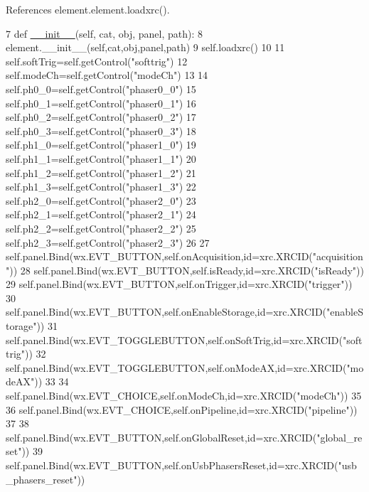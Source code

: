 References element.\+element.\+loadxrc().


\begin{DoxyCode}
7     \textcolor{keyword}{def }\hyperlink{classwrapper_1_1ModuleDictWrapper_a9a7a794150502f51df687831583e13b9}{\_\_init\_\_}(self, cat, obj, panel, path):
8         element.\_\_init\_\_(self,cat,obj,panel,path)
9         self.loadxrc()
10 
11         self.softTrig=self.getControl(\textcolor{stringliteral}{"softtrig"})
12         self.modeCh=self.getControl(\textcolor{stringliteral}{"modeCh"})
13 
14         self.ph0\_0=self.getControl(\textcolor{stringliteral}{"phaser0\_0"})
15         self.ph0\_1=self.getControl(\textcolor{stringliteral}{"phaser0\_1"})
16         self.ph0\_2=self.getControl(\textcolor{stringliteral}{"phaser0\_2"})
17         self.ph0\_3=self.getControl(\textcolor{stringliteral}{"phaser0\_3"})
18         self.ph1\_0=self.getControl(\textcolor{stringliteral}{"phaser1\_0"})
19         self.ph1\_1=self.getControl(\textcolor{stringliteral}{"phaser1\_1"})
20         self.ph1\_2=self.getControl(\textcolor{stringliteral}{"phaser1\_2"})
21         self.ph1\_3=self.getControl(\textcolor{stringliteral}{"phaser1\_3"})
22         self.ph2\_0=self.getControl(\textcolor{stringliteral}{"phaser2\_0"})
23         self.ph2\_1=self.getControl(\textcolor{stringliteral}{"phaser2\_1"})
24         self.ph2\_2=self.getControl(\textcolor{stringliteral}{"phaser2\_2"})
25         self.ph2\_3=self.getControl(\textcolor{stringliteral}{"phaser2\_3"})
26 
27         self.panel.Bind(wx.EVT\_BUTTON,self.onAcquisition,id=xrc.XRCID(\textcolor{stringliteral}{"acquisition"}))
28         self.panel.Bind(wx.EVT\_BUTTON,self.isReady,id=xrc.XRCID(\textcolor{stringliteral}{"isReady"}))
29         self.panel.Bind(wx.EVT\_BUTTON,self.onTrigger,id=xrc.XRCID(\textcolor{stringliteral}{"trigger"}))
30         self.panel.Bind(wx.EVT\_BUTTON,self.onEnableStorage,id=xrc.XRCID(\textcolor{stringliteral}{"enableStorage"}))
31         self.panel.Bind(wx.EVT\_TOGGLEBUTTON,self.onSoftTrig,id=xrc.XRCID(\textcolor{stringliteral}{"softtrig"}))
32         self.panel.Bind(wx.EVT\_TOGGLEBUTTON,self.onModeAX,id=xrc.XRCID(\textcolor{stringliteral}{"modeAX"}))
33 
34         self.panel.Bind(wx.EVT\_CHOICE,self.onModeCh,id=xrc.XRCID(\textcolor{stringliteral}{"modeCh"}))
35 
36         self.panel.Bind(wx.EVT\_CHOICE,self.onPipeline,id=xrc.XRCID(\textcolor{stringliteral}{"pipeline"}))
37 
38         self.panel.Bind(wx.EVT\_BUTTON,self.onGlobalReset,id=xrc.XRCID(\textcolor{stringliteral}{"global\_reset"}))
39         self.panel.Bind(wx.EVT\_BUTTON,self.onUsbPhasersReset,id=xrc.XRCID(\textcolor{stringliteral}{"usb\_phasers\_reset"}))

\end{DoxyCode}
